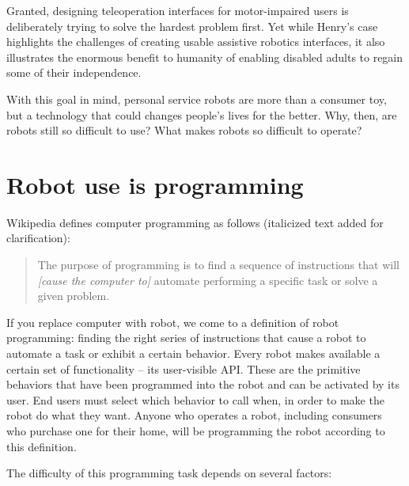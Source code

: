 \documentclass[10pt,twocolumn]{article}
\begin{document}
Granted, designing teleoperation interfaces for motor-impaired users is deliberately trying to solve the hardest problem first.  Yet while Henry's case highlights the challenges of creating usable assistive robotics interfaces, it also illustrates the enormous benefit to humanity of enabling disabled adults to regain some of their independence.

With this goal in mind, personal service robots are more than a consumer toy, but a technology that could changes people's lives for the better.
Why, then, are robots still so difficult to use? What makes robots so difficult to operate?

\section{Robot use is programming}

Wikipedia defines computer programming as follows (italicized text added for clarification):

\begin{quote}
The purpose of programming is to find a sequence of instructions that will {\it [cause the computer to]} automate performing a specific task or solve a given problem.
\end{quote}

If you replace computer with robot, we come to a definition of robot programming: finding the right series of instructions that cause a robot to automate a task or exhibit a certain behavior. Every robot makes available a certain set of functionality -- its user-visible API. These are the primitive behaviors that have been programmed into the robot and can be activated by its user. End users must select which behavior to call when, in order to make the robot do what they want. Anyone who operates a robot, including consumers who purchase one for their home, will be programming the robot according to this definition.

The difficulty of this programming task depends on several factors:
\end{document}
